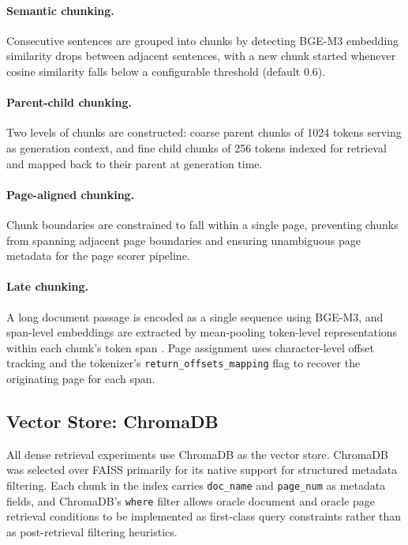 \documentclass[12pt,twoside,maitrise]{dms}
\theoremstyle{definition}
\numberwithin{equation}{section}
\numberwithin{table}{chapter}
\numberwithin{figure}{chapter}
\begin{document}
\paragraph{Semantic chunking.} Consecutive sentences are grouped into chunks by
detecting BGE-M3 embedding similarity drops between adjacent sentences, with a new
chunk started whenever cosine similarity falls below a configurable threshold
(default 0.6).

\paragraph{Parent-child chunking.} Two levels of chunks are constructed: coarse parent
chunks of 1024 tokens serving as generation context, and fine child chunks of 256 tokens
indexed for retrieval and mapped back to their parent at generation time.

\paragraph{Page-aligned chunking.} Chunk boundaries are constrained to fall within a
single page, preventing chunks from spanning adjacent page boundaries and ensuring
unambiguous page metadata for the page scorer pipeline.

\paragraph{Late chunking.} A long document passage is encoded as a single sequence
using BGE-M3, and span-level embeddings are extracted by mean-pooling token-level
representations within each chunk's token span \citep{gunther2024jina}. Page assignment
uses character-level offset tracking and the tokenizer's
\texttt{return\_offsets\_mapping} flag to recover the originating page for each span.

\subsection{Vector Store: ChromaDB}
\label{sec:vectorstore}

All dense retrieval experiments use ChromaDB \citep{chromadb2023}  as the vector store. ChromaDB was selected
over FAISS \citep{douze2025faiss}  primarily for its native support for structured metadata filtering. Each chunk
in the index carries \texttt{doc\_name} and \texttt{page\_num} as metadata fields, and
ChromaDB's \texttt{where} filter allows oracle document and oracle page retrieval
conditions to be implemented as first-class query constraints rather than as
post-retrieval filtering heuristics. 
\end{document}

